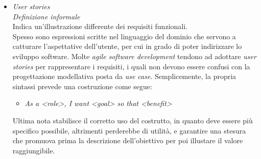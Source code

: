 \documentclass{article}
\begin{document}
\begin{itemize}[label={-}]
    \item \textit{User stories}\vspace*{7pt}\\\textit{Definizione informale}\\Indica un'illustrazione differente dei requisiti funzionali.\vspace*{14pt}\\Spesso sono espressioni scritte nel linguaggio del dominio che servono a catturare l'aspettative dell'utente, per cui in grado di poter indirizzare lo sviluppo software. Molte \textit{agile software development} tendono ad adottare \textit{user stories} per rappresentare i requisiti, i quali non devono essere confusi con la progettazione modellativa posta da \textit{use case}. Semplicemente, la propria sintassi prevede una costruzione come segue: \begin{itemize}[label={ }, leftmargin=1cm] \item \textit{As a <role>, I want <goal> so that <benefit>}\end{itemize} Ultima nota stabilisce il corretto uso del costrutto, in quanto deve essere più specifico possibile, altrimenti perderebbe di utilità, e garantire una stesura che promuova prima la descrizione dell'obiettivo per poi illustare il valore raggiungibile.
\end{itemize}
\end{document}
